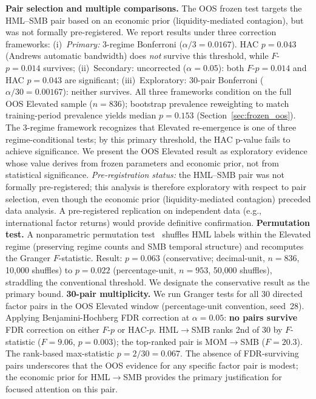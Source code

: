 \documentclass[sigconf,anonymous]{acmart}
\begin{document}
\textbf{Pair selection and multiple comparisons.} The OOS frozen test targets
the HML--SMB pair based on an economic prior (liquidity-mediated contagion),
but was not formally pre-registered. We report results under
three correction frameworks:
(i)~\emph{Primary:} 3-regime Bonferroni ($\alpha/3 = 0.0167$). HAC $p = 0.043$ (Andrews automatic bandwidth)
does \emph{not} survive this threshold, while $F$-$p = 0.014$ survives;
(ii)~Secondary: uncorrected ($\alpha = 0.05$): both $F$-$p = 0.014$ and HAC $p = 0.043$ are significant;
(iii)~Exploratory: 30-pair Bonferroni ($\alpha/30 = 0.00167$): neither survives.
All three frameworks condition on the full OOS Elevated sample ($n = 836$);
bootstrap prevalence reweighting to match training-period prevalence
yields median $p = 0.153$ (Section~\ref{sec:frozen_oos}).
The 3-regime framework recognizes that Elevated re-emergence is one of three
regime-conditional tests; by this primary threshold, the HAC p-value fails to achieve significance.
We present the OOS Elevated result as exploratory evidence whose
value derives from frozen parameters and economic prior, not from statistical significance.
\emph{Pre-registration status:} the HML--SMB pair was not formally pre-registered;
this analysis is therefore exploratory with respect to pair selection, even
though the economic prior (liquidity-mediated contagion) preceded data analysis.
A pre-registered replication on independent data (e.g., international factor
returns) would provide definitive confirmation.
\textbf{Permutation test.} A nonparametric permutation
test~\cite{good2005permutation} shuffles HML labels within the Elevated regime
(preserving regime counts and SMB temporal structure) and recomputes the Granger
$F$-statistic. Result: $p = 0.063$ (conservative; decimal-unit, $n = 836$,
10{,}000 shuffles) to $p = 0.022$ (percentage-unit, $n = 953$, 50{,}000 shuffles),
straddling the conventional threshold. We designate the conservative result as the
primary bound.
\textbf{30-pair multiplicity.} We run Granger tests for all 30 directed factor pairs
in the OOS Elevated window (percentage-unit convention, seed~28).
Applying Benjamini-Hochberg FDR correction at $\alpha = 0.05$:
\textbf{no pairs survive} FDR correction on either $F$-$p$ or HAC-$p$.
HML$\to$SMB ranks 2nd of 30 by $F$-statistic
($F = 9.06$, $p = 0.003$); the top-ranked pair is MOM$\to$SMB ($F = 20.3$).
The rank-based max-statistic $p = 2/30 = 0.067$.
The absence of FDR-surviving pairs underscores that the OOS evidence for any
specific factor pair is modest; the economic prior for HML$\to$SMB provides the
primary justification for focused attention on this pair.
\end{document}

